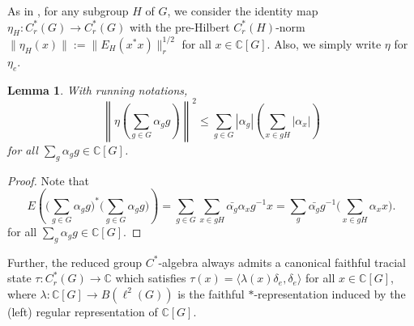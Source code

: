 \documentclass{amsart}
\numberwithin{equation}{section}
\newcommand{\C}{\mathbb C}
\newcommand{\1}{\mathbf{1}}
\newtheorem{lemma}[theorem]{Lemma}
\begin{document}
As in , for any subgroup $H$ of $G$, we
consider the identity map $\eta_H: C^*_r(G) \to C^*_r(G)$ with the
pre-Hilbert $C^*_r(H)$-norm $\|\eta_H(x)\|:= \|E_H(x^*x)\|_r^{1/2}$
for all $x \in \C[G]$. Also, we simply write $\eta$ for $ \eta_{e}$.

\begin{lemma}\label{ce-on-CG}
With running notations, 
\begin{equation}
\left\|\eta\left(\sum_{g \in G} \alpha_g g \right)\right\|^2\leq \sum_{g
   \in G} |\alpha_g| \left( \sum_{x \in gH}|\alpha_x|\right)
 \end{equation}
 for all
 $\sum_g \alpha_g g \in \C[G]$.
\end{lemma}
\begin{proof}
  Note that
  \[
  E\left(\Big(\sum_{g \in G}
  \alpha_g g\Big)^*\Big(\sum_{g \in G} \alpha_g g\Big)\right)= \sum_{g
    \in G} \sum_{x \in gH} \bar{\alpha_g}\alpha_x g^{-1}x =
  \sum_g \bar{\alpha_g}g^{-1} \Big(\sum_{x \in g H} \alpha_x x\Big).
  \]
 for all
 $\sum_g \alpha_g g \in \C[G]$.
\end{proof}

Further, the reduced group $C^*$-algebra always admits a canonical
faithful tracial state $\tau: C^*_r(G) \to \C$ which satisfies
$\tau(x) = \langle \lambda(x) \delta_e , \delta_e \rangle$ for all $x
\in \C[G]$, where $\lambda: \C[G] \to B(\ell^2(G))$ is the faithful $*$-representation induced by the (left)
regular representation of $\C[G]$.
\end{document}
